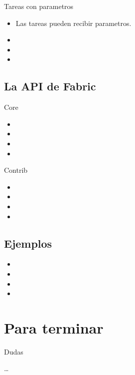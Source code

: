 \documentclass[10pt]{beamer}
\begin{document}
  \begin{frame}{Tareas con parametros}
    \begin{itemize}
      \item Las tareas pueden recibir parametros.
      \item 
      \item 
      \item 
    \end{itemize}
  \end{frame}
  
  \subsection*{La API de Fabric}
  \begin{frame}{Core}
    \begin{itemize}
      \item 
      \item 
      \item 
      \item 
    \end{itemize}
  \end{frame}

  \begin{frame}{Contrib}
    \begin{itemize}
      \item 
      \item 
      \item 
      \item 
    \end{itemize}
  \end{frame}
  
  \subsection*{Ejemplos}
  \begin{frame}{}
    \begin{itemize}
      \item 
      \item 
      \item 
      \item 
    \end{itemize}
  \end{frame}

  \section*{Para terminar}

  \begin{frame}{Dudas}
    \begin{center}
      \dots
    \end{center}
  \end{frame}
\end{document}
